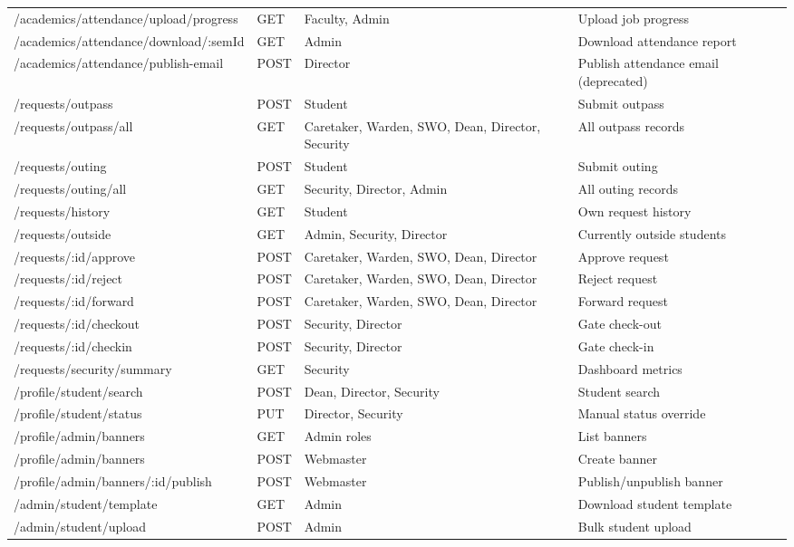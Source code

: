 \documentclass[12pt,a4paper]{report}
\begin{document}
\begin{longtable}{p{4.3cm}p{1.6cm}p{3.2cm}p{3.5cm}}
/academics/attendance/upload/progress & GET & Faculty, Admin & Upload job progress \\
/academics/attendance/download/:semId & GET & Admin & Download attendance report \\
/academics/attendance/publish-email & POST & Director & Publish attendance email (deprecated) \\
/requests/outpass & POST & Student & Submit outpass \\
/requests/outpass/all & GET & Caretaker, Warden, SWO, Dean, Director, Security & All outpass records \\
/requests/outing & POST & Student & Submit outing \\
/requests/outing/all & GET & Security, Director, Admin & All outing records \\
/requests/history & GET & Student & Own request history \\
/requests/outside & GET & Admin, Security, Director & Currently outside students \\
/requests/:id/approve & POST & Caretaker, Warden, SWO, Dean, Director & Approve request \\
/requests/:id/reject & POST & Caretaker, Warden, SWO, Dean, Director & Reject request \\
/requests/:id/forward & POST & Caretaker, Warden, SWO, Dean, Director & Forward request \\
/requests/:id/checkout & POST & Security, Director & Gate check-out \\
/requests/:id/checkin & POST & Security, Director & Gate check-in \\
/requests/security/summary & GET & Security & Dashboard metrics \\
/profile/student/search & POST & Dean, Director, Security & Student search \\
/profile/student/status & PUT & Director, Security & Manual status override \\
/profile/admin/banners & GET & Admin roles & List banners \\
/profile/admin/banners & POST & Webmaster & Create banner \\
/profile/admin/banners/:id/publish & POST & Webmaster & Publish/unpublish banner \\
/admin/student/template & GET & Admin & Download student template \\
/admin/student/upload & POST & Admin & Bulk student upload \\
\end{longtable}
\end{document}
